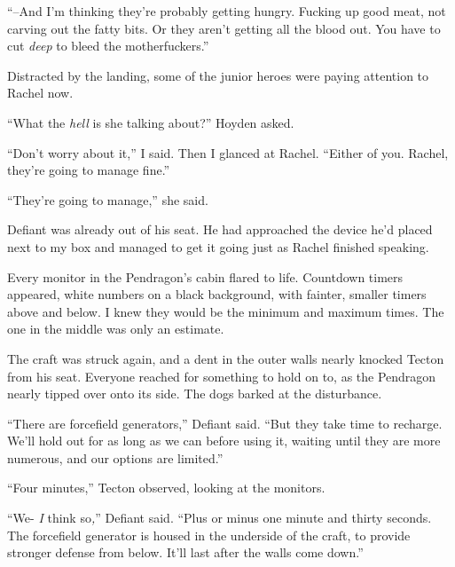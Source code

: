 ``--And I'm thinking they're probably getting hungry.  Fucking up good meat, not carving out the fatty bits.  Or they aren't getting all the blood out.  You have to cut \emph{deep }to bleed\emph{ }the motherfuckers.''



Distracted by the landing, some of the junior heroes were paying attention to Rachel now.



``What the \emph{hell} is she talking about?'' Hoyden asked.



``Don't worry about it,'' I said.  Then I glanced at Rachel.  ``Either of you.  Rachel, they're going to manage fine.''



``They're going to manage,'' she said.



Defiant was already out of his seat.  He had approached the device he'd placed next to my box and managed to get it going just as Rachel finished speaking.



Every monitor in the Pendragon's cabin flared to life.  Countdown timers appeared, white numbers on a black background, with fainter, smaller timers above and below.  I knew they would be the minimum and maximum times.  The one in the middle was only an estimate.



The craft was struck again, and a dent in the outer walls nearly knocked Tecton from his seat.  Everyone reached for something to hold on to, as the Pendragon nearly tipped over onto its side.  The dogs barked at the disturbance.



``There are forcefield generators,'' Defiant said.  ``But they take time to recharge.  We'll hold out for as long as we can before using it, waiting until they are more numerous, and our options are limited.''



``Four minutes,'' Tecton observed, looking at the monitors.



``We- \emph{I} think so\emph{,}'' Defiant said.  ``Plus or minus one minute and thirty seconds.  The forcefield generator is housed in the underside of the craft, to provide stronger defense from below.  It'll last after the walls come down.''



